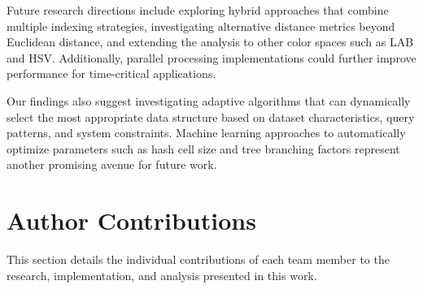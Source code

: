 \documentclass{sbc2023}
\begin{document}
Future research directions include exploring hybrid approaches that combine multiple indexing strategies, investigating alternative distance metrics beyond Euclidean distance, and extending the analysis to other color spaces such as LAB and HSV. Additionally, parallel processing implementations could further improve performance for time-critical applications.

Our findings also suggest investigating adaptive algorithms that can dynamically select the most appropriate data structure based on dataset characteristics, query patterns, and system constraints. Machine learning approaches to automatically optimize parameters such as hash cell size and tree branching factors represent another promising avenue for future work.

\section*{Author Contributions}
\label{sec:contributions}

This section details the individual contributions of each team member to the research, implementation, and analysis presented in this work.
\end{document}
